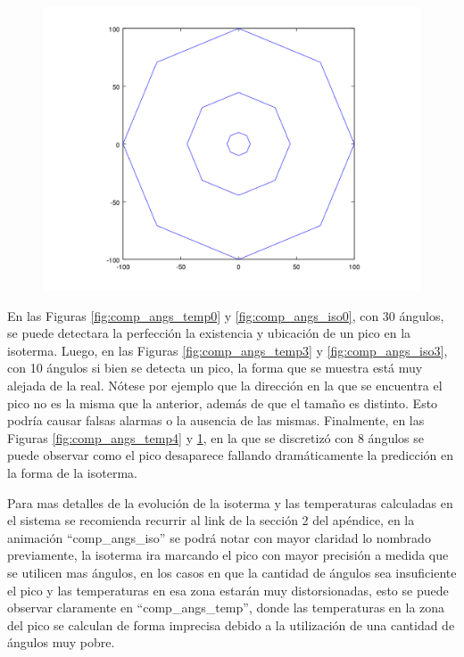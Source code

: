 \begin{figure}[H]
\begin{minipage}{0.30\textwidth}
  \centering
    \includegraphics[width=1\textwidth]{imgs/comp_angulos/comp_angs_iso4.png} 
  \caption{}
  \label{fig:comp_angs_iso4}
\end{minipage}
\end{figure}

En las Figuras \ref{fig:comp_angs_temp0} y \ref{fig:comp_angs_iso0}, con 30 ángulos, se puede detectara la perfección la existencia y ubicación de un pico en la isoterma. Luego, en las Figuras \ref{fig:comp_angs_temp3} y \ref{fig:comp_angs_iso3}, con 10 ángulos si bien se detecta un pico, la forma que se muestra está muy alejada de la real. Nótese por ejemplo que la dirección en la que se encuentra el pico no es la misma que la anterior, además de que el tamaño es distinto. Esto podría causar falsas alarmas o la ausencia de las mismas.
Finalmente, en las Figuras \ref{fig:comp_angs_temp4} y \ref{fig:comp_angs_iso4}, en la que se discretizó con 8 ángulos se puede observar como el pico desaparece fallando dramáticamente la predicción en la forma de la isoterma. 

Para mas detalles de la evolución de la isoterma y las temperaturas calculadas en el sistema se recomienda recurrir al link de la sección 2 del apéndice, en la animación ``comp\_angs\_iso'' se podrá notar con mayor claridad lo nombrado previamente, la isoterma ira marcando el pico con mayor precisión a medida que se utilicen mas ángulos, en los casos en que la cantidad de ángulos sea insuficiente el pico y las temperaturas en esa zona estarán muy distorsionadas, esto se puede observar claramente en ``comp\_angs\_temp'', donde las temperaturas en la zona del pico se calculan de forma imprecisa debido a la utilización de una cantidad de ángulos muy pobre.


